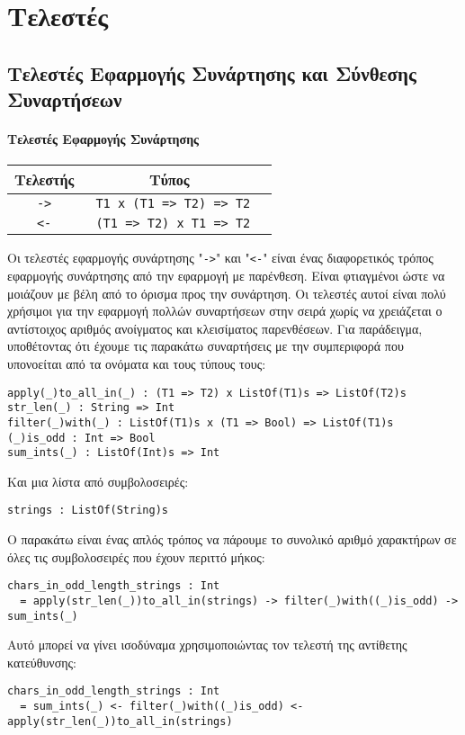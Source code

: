\documentclass[diploma]{softlab-thesis}
\begin{document}
\section{Τελεστές}

\subsection{Τελεστές Εφαρμογής Συνάρτησης και Σύνθεσης Συναρτήσεων}

\paragraph{Τελεστές Εφαρμογής Συνάρτησης}

\begin{center}
\begin{tabular}{ |c|c|c| }
\hline
Τελεστής & Τύπος
\\
\hline
\hline
\verb|->| & \verb| T1 x (T1 => T2) => T2|
\\
\hline
\verb|<-| & \verb| (T1 => T2) x T1 => T2|
\\
\hline
\end{tabular}
\end{center}
Οι τελεστές εφαρμογής συνάρτησης "\verb|->|" και "\verb|<-|" είναι ένας
διαφορετικός τρόπος εφαρμογής συνάρτησης από την εφαρμογή με παρένθεση.  Είναι
φτιαγμένοι ώστε να μοιάζουν με βέλη από το όρισμα προς την συνάρτηση. Οι
τελεστές αυτοί είναι πολύ χρήσιμοι για την εφαρμογή πολλών συναρτήσεων στην
σειρά χωρίς να χρειάζεται ο αντίστοιχος αριθμός ανοίγματος και κλεισίματος
παρενθέσεων. Για παράδειγμα, υποθέτοντας ότι έχουμε τις παρακάτω συναρτήσεις με
την συμπεριφορά που υπονοείται από τα ονόματα και τους τύπους τους:
\begin{verbatim}
apply(_)to_all_in(_) : (T1 => T2) x ListOf(T1)s => ListOf(T2)s
str_len(_) : String => Int
filter(_)with(_) : ListOf(T1)s x (T1 => Bool) => ListOf(T1)s
(_)is_odd : Int => Bool
sum_ints(_) : ListOf(Int)s => Int
\end{verbatim}
Και μια λίστα από συμβολοσειρές:
\begin{verbatim}
strings : ListOf(String)s
\end{verbatim}
Ο παρακάτω είναι ένας απλός τρόπος να πάρουμε το συνολικό αριθμό χαρακτήρων
σε όλες τις συμβολοσειρές που έχουν περιττό μήκος:
\begin{verbatim}
chars_in_odd_length_strings : Int
  = apply(str_len(_))to_all_in(strings) -> filter(_)with((_)is_odd) -> sum_ints(_)
\end{verbatim}
Αυτό μπορεί να γίνει ισοδύναμα χρησιμοποιώντας τον τελεστή της αντίθετης
κατεύθυνσης:
\begin{verbatim}
chars_in_odd_length_strings : Int
  = sum_ints(_) <- filter(_)with((_)is_odd) <- apply(str_len(_))to_all_in(strings)

\end{verbatim}
\end{document}
